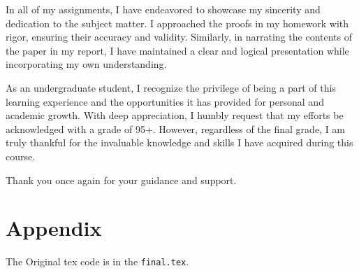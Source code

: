 \documentclass{article}
\begin{document}
In all of my assignments, I have endeavored to showcase my sincerity and dedication to the subject matter. I approached the proofs in my homework with rigor, ensuring their accuracy and validity. Similarly, in narrating the contents of the paper in my report, I have maintained a clear and logical presentation while incorporating my own understanding.

As an undergraduate student, I recognize the privilege of being a part of this learning experience and the opportunities it has provided for personal and academic growth. With deep appreciation, I humbly request that my efforts be acknowledged with a grade of 95+. However, regardless of the final grade, I am truly thankful for the invaluable knowledge and skills I have acquired during this course.

Thank you once again for your guidance and support.







\appendix
\section{Appendix}

The Original tex code is in the \texttt{final.tex}.
\end{document}
